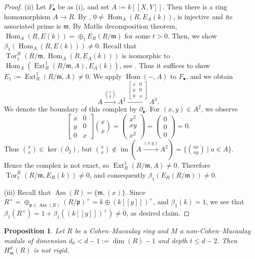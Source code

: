 \documentclass[11pt,a4paper]{amsart}
\numberwithin{equation}{section}
\newtheorem{proposition}[theorem]{Proposition}
\theoremstyle{definition}
\theoremstyle{remark}
\newcommand{\Ass}{\operatorname{Ass}}
\newcommand{\fm}{\mathfrak{m}}
\newcommand{\fp}{\mathfrak{p}}
\begin{document}
\begin{proof}
	
(ii)	Let $F_\bullet$ be as (i), and set $A:=k[[X,Y]]$. Then there is a ring homomorphism $A\to R$.  By \cite[Lemma 3.16]{BH}, \(0\neq  \operatorname{Hom}_A(R,E_A(k))\),   is injective and its associated prime is \(\mathfrak{m}\). By Matlis decomposition theorem,
$\operatorname{Hom}_A(R,E(k))	=\oplus_t E_R(R/\mathfrak{m})$ for some $t>0$.
Then, we show \(\beta_1(\operatorname{Hom}_A(R,E(k)))\neq 0\). Recall that \(\operatorname{Tor}_1^R(R/\mathfrak{m},\operatorname{Hom}_A(R,E_A(k)))\) is isomorphic to \(\operatorname{Hom}_A(\operatorname{Ext}_R^1(R/\mathfrak{m},A),E_A(k))\), see \cite[3.2.1]{en}. Thus it suffices to show \(E_1:=\operatorname{Ext}_R^1(R/\mathfrak{m},A)\neq 0\).  We apply   \(\operatorname{Hom}(-,A)\) to $F_\bullet$, and we obtain
\[A \xrightarrow{\binom{x}{y}} A^2 \xrightarrow{\begin{bmatrix}x&0\\y&0\\0&x\end{bmatrix}} A^3.
	\]
We denote the boundary of this complex  by $\partial_\bullet$.	For \((x,y)\in A^2\), we observe
\[
	\begin{bmatrix}x&0\\y&0\\0&x\end{bmatrix}\binom{x}{x} = \begin{pmatrix}x^2\\xy\\x^2\end{pmatrix}= \begin{pmatrix}0\\0\\0\end{pmatrix}=0.
	\]
Thus \(\binom{x}{x}\in \ker(\partial_2)\), but \(\binom{x}{x}\notin \operatorname{im}(A \xrightarrow{(x\;y)} A^2) = \{\binom{ax}{ay}\mid a\in A\}\). Hence the complex is not exact, so \(\operatorname{Ext}_R^1(R/\mathfrak{m},A)\neq 0\). Therefore \(\operatorname{Tor}_1^R(R/\mathfrak{m},E_R(k))\neq 0\), and consequently \(\beta_1(E_R(R/\mathfrak{m}))\neq 0\).


(iii) Recall that $\Ass(R)=\{\fm, (x)\}$. Since $R^+=\oplus_{\fp\in\Ass(R)} (R/\fp)^+=k\oplus (k[[y]])^+$, and $\beta_1(k)=1$, we see that $\beta_1(R^+)=1+\beta_1((k[[y]])^+)\neq 0$, as desired claim. \end{proof}

\begin{proposition}\label{prop:non-rigid}
Let \(R\) be a Cohen--Macaulay ring and \(M\) a non-Cohen--Macaulay module of dimension \(d_0< d-1:=\dim(R)-1\) and depth \(t\le d-2\). Then \(H^d_{\mathfrak{m}}(R)\) is not rigid.
\end{proposition}
\end{document}
